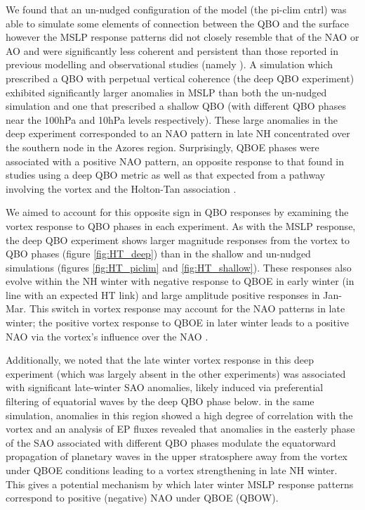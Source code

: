 We found that an un-nudged configuration of the model (the pi-clim cntrl) was able to simulate some elements of connection between the QBO and the surface however the MSLP response patterns did not closely resemble that of the NAO or AO and were significantly less coherent and persistent than those reported in previous modelling and observational studies (namely \cite{andrewsObserved2019d}). A simulation which prescribed a QBO with perpetual vertical coherence (the deep QBO experiment) exhibited significantly larger anomalies in MSLP than both the un-nudged simulation and one that prescribed a shallow QBO (with different QBO phases near the 100hPa and 10hPa levels respectively). These large anomalies in the deep experiment corresponded to an NAO pattern in late NH concentrated over the southern node in the Azores region. Surprisingly, QBOE phases were associated with a positive NAO pattern, an opposite response to that found in studies using a deep QBO metric \citep{andrewsObserved2019d} as well as that expected from a pathway involving the vortex and the Holton-Tan association \citep{HoltonJamesRTan1980}.

We aimed to account for this opposite sign in QBO responses by examining the vortex response to QBO phases in each experiment. As with the MSLP response, the deep QBO experiment shows larger magnitude responses from the vortex to QBO phases (figure \ref{fig:HT_deep}) than in the shallow and un-nudged simulations (figures \ref{fig:HT_piclim} and \ref{fig:HT_shallow}). These responses also evolve within the NH winter with negative response to QBOE in early winter (in line with an expected HT link) and large amplitude positive responses in Jan-Mar. This switch in vortex response may account for the NAO patterns in late winter; the positive vortex response to QBOE in later winter leads to a positive NAO via the vortex's influence over the NAO \citep{charlton-perezInfluence2018e}. 

Additionally, we noted that the late winter vortex response in this deep experiment (which was largely absent in the other experiments) was associated with significant late-winter SAO anomalies, likely induced via preferential filtering of equatorial waves by the deep QBO phase below. in the same simulation, anomalies in this region showed a high degree of correlation with the vortex and an analysis of EP fluxes revealed that anomalies in the easterly phase of the SAO associated with different QBO phases modulate the equatorward propagation of planetary waves in the upper stratosphere away from the vortex under QBOE conditions leading to a vortex strengthening in late NH winter. This gives a potential mechanism by which later winter MSLP response patterns correspond to positive (negative) NAO under QBOE (QBOW). 

